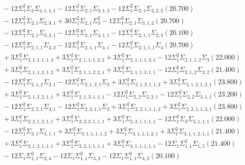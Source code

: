 \documentclass[12pt]{article}
\begin{document}
\begin{landscape}
\begin{align*}
		&\quad\quad -12\Sigma_{1}^{2}\Sigma_{2}\Sigma_{4,1,1,1}-12\Sigma_{1}^{2}\Sigma_{2,1}\Sigma_{2,1,3}-12\Sigma_{1}^{2}\Sigma_{2,1}\Sigma_{2,2,2}(20.700) \\ 
		&\quad\quad -12\Sigma_{1}^{2}\Sigma_{2,1}\Sigma_{2,3,1}+30\Sigma_{1}^{2}\Sigma_{2,1}\Sigma_{3}^{2}-12\Sigma_{1}^{2}\Sigma_{2,1}\Sigma_{3,1,2}(20.700) \\ 
		&\quad\quad -12\Sigma_{1}^{2}\Sigma_{2,1}\Sigma_{3,2,1}-12\Sigma_{1}^{2}\Sigma_{2,1}\Sigma_{4,1,1}-12\Sigma_{1}^{2}\Sigma_{2,1,1}\Sigma_{2,3}(20.100) \\ 
		&\quad\quad -12\Sigma_{1}^{2}\Sigma_{2,1,1}\Sigma_{3,2}-12\Sigma_{1}^{2}\Sigma_{2,1,1}\Sigma_{4,1}-12\Sigma_{1}^{2}\Sigma_{2,1,1,1}\Sigma_{4}(20.700) \\ 
		&\quad\quad +3\Sigma_{1}^{2}\Sigma_{2,1,1,1,1,3}+3\Sigma_{1}^{2}\Sigma_{2,1,1,1,2,2}+3\Sigma_{1}^{2}\Sigma_{2,1,1,1,3,1}-12\Sigma_{1}^{2}\Sigma_{2,1,1,2}\Sigma_{3}(22.000) \\ 
		&\quad\quad +3\Sigma_{1}^{2}\Sigma_{2,1,1,2,1,2}+3\Sigma_{1}^{2}\Sigma_{2,1,1,2,2,1}+3\Sigma_{1}^{2}\Sigma_{2,1,1,3,1,1}-12\Sigma_{1}^{2}\Sigma_{2,1,2}\Sigma_{2,2}(21.400) \\ 
		&\quad\quad -12\Sigma_{1}^{2}\Sigma_{2,1,2}\Sigma_{3,1}-12\Sigma_{1}^{2}\Sigma_{2,1,2,1}\Sigma_{3}+3\Sigma_{1}^{2}\Sigma_{2,1,2,1,1,2}+3\Sigma_{1}^{2}\Sigma_{2,1,2,1,2,1}(23.800) \\ 
		&\quad\quad +3\Sigma_{1}^{2}\Sigma_{2,1,2,2,1,1}+3\Sigma_{1}^{2}\Sigma_{2,1,3,1,1,1}-12\Sigma_{1}^{2}\Sigma_{2,2}\Sigma_{2,2,1}-12\Sigma_{1}^{2}\Sigma_{2,2}\Sigma_{3,1,1}(23.200) \\ 
		&\quad\quad -12\Sigma_{1}^{2}\Sigma_{2,2,1}\Sigma_{3,1}-12\Sigma_{1}^{2}\Sigma_{2,2,1,1}\Sigma_{3}+3\Sigma_{1}^{2}\Sigma_{2,2,1,1,1,2}+3\Sigma_{1}^{2}\Sigma_{2,2,1,1,2,1}(23.800) \\ 
		&\quad\quad +3\Sigma_{1}^{2}\Sigma_{2,2,1,2,1,1}+3\Sigma_{1}^{2}\Sigma_{2,2,2,1,1,1}+3\Sigma_{1}^{2}\Sigma_{2,3,1,1,1,1}-12\Sigma_{1}^{2}\Sigma_{3}\Sigma_{3,1,1,1}(22.000) \\ 
		&\quad\quad -12\Sigma_{1}^{2}\Sigma_{3,1}\Sigma_{3,1,1}+3\Sigma_{1}^{2}\Sigma_{3,1,1,1,1,2}+3\Sigma_{1}^{2}\Sigma_{3,1,1,1,2,1}+3\Sigma_{1}^{2}\Sigma_{3,1,1,2,1,1}(21.400) \\ 
		&\quad\quad +3\Sigma_{1}^{2}\Sigma_{3,1,2,1,1,1}+3\Sigma_{1}^{2}\Sigma_{3,2,1,1,1,1}+3\Sigma_{1}^{2}\Sigma_{4,1,1,1,1,1}-12\Sigma_{1}\Sigma_{1,1}^{2}\Sigma_{1,5}(21.400) \\ 
		&\quad\quad -12\Sigma_{1}\Sigma_{1,1}^{2}\Sigma_{2,4}-12\Sigma_{1}\Sigma_{1,1}^{2}\Sigma_{3,3}-12\Sigma_{1}\Sigma_{1,1}^{2}\Sigma_{4,2}(20.100) \\ 

\end{align*}
\end{landscape}
\end{document}
